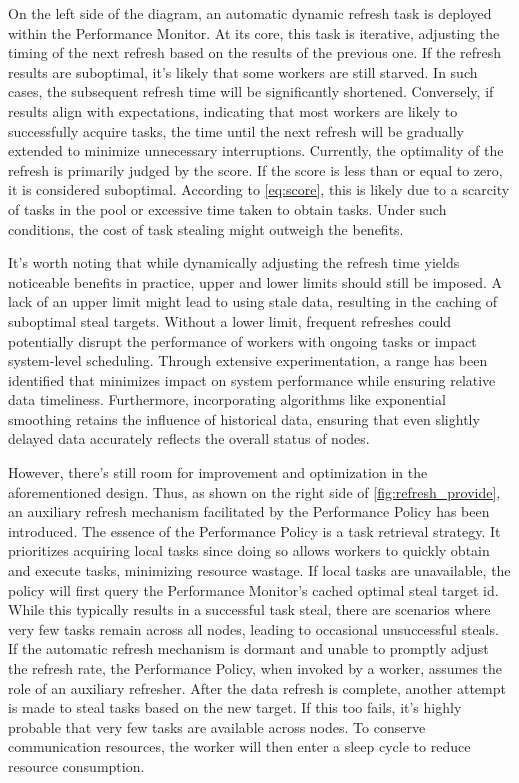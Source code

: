 \documentclass{mproj}
\begin{document}
On the left side of the diagram, an automatic dynamic refresh task is deployed within the Performance Monitor.
At its core, this task is iterative, adjusting the timing of the next refresh based on the results of the previous one.
If the refresh results are suboptimal, it's likely that some workers are still starved.
In such cases, the subsequent refresh time will be significantly shortened.
Conversely, if results align with expectations, indicating that most workers are likely to successfully acquire tasks,
the time until the next refresh will be gradually extended to minimize unnecessary interruptions.
Currently, the optimality of the refresh is primarily judged by the score.
If the score is less than or equal to zero, it is considered suboptimal.
According to \ref{eq:score}, this is likely due to a scarcity of tasks in the pool or excessive time taken to obtain tasks.
Under such conditions, the cost of task stealing might outweigh the benefits.

It's worth noting that while dynamically adjusting the refresh time yields noticeable benefits in practice,
upper and lower limits should still be imposed.
A lack of an upper limit might lead to using stale data, resulting in the caching of suboptimal steal targets.
Without a lower limit, frequent refreshes could potentially disrupt the performance of workers with ongoing tasks or impact system-level scheduling.
Through extensive experimentation, a range has been identified that minimizes impact on system performance while ensuring relative data timeliness.
Furthermore, incorporating algorithms like exponential smoothing retains the influence of historical data,
ensuring that even slightly delayed data accurately reflects the overall status of nodes.

However, there's still room for improvement and optimization in the aforementioned design.
Thus, as shown on the right side of \ref{fig:refresh_provide}, an auxiliary refresh mechanism facilitated by the Performance Policy has been introduced.
The essence of the Performance Policy is a task retrieval strategy.
It prioritizes acquiring local tasks since doing so allows workers to quickly obtain and execute tasks, minimizing resource wastage.
If local tasks are unavailable, the policy will first query the Performance Monitor's cached optimal steal target id.
While this typically results in a successful task steal, there are scenarios where very few tasks remain across all nodes,
leading to occasional unsuccessful steals.
If the automatic refresh mechanism is dormant and unable to promptly adjust the refresh rate,
the Performance Policy, when invoked by a worker, assumes the role of an auxiliary refresher.
After the data refresh is complete, another attempt is made to steal tasks based on the new target.
If this too fails, it's highly probable that very few tasks are available across nodes.
To conserve communication resources, the worker will then enter a sleep cycle to reduce resource consumption.
\end{document}
